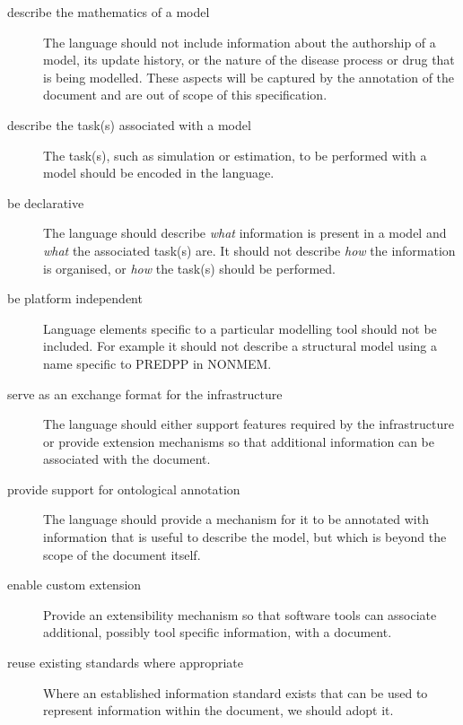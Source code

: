 \begin{description}
\item[describe the mathematics of a model] The language should not include 
information about the authorship of a model, its update history, or the nature 
of the disease process or drug that is being modelled. These aspects will be 
captured by the annotation of the \pharmml document and are out of scope 
of this specification.
\item[describe the task(s) associated with a model] The task(s), such as simulation 
or estimation, to be performed with a model should be encoded in the language.
\item[be declarative] The language should describe \emph{what} information is 
present in a model and \emph{what} the associated task(s) are. It should not 
describe \emph{how} the information is organised, or \emph{how} the task(s) 
should be performed.
\item[be platform independent] Language elements specific to a particular 
modelling tool should not be included. For example it should not describe 
a structural model using a name specific to PREDPP in NONMEM.
\item[serve as an exchange format for the \ddmore infrastructure] The language 
should either support features required by the infrastructure or provide extension 
mechanisms so that additional information can be associated with the \pharmml 
document.
\item[provide support for ontological annotation] The language should provide 
a mechanism for it to be annotated with information that is useful to describe 
the model, but which is beyond the scope of the \pharmml document itself.
\item[enable custom extension] Provide an extensibility mechanism so that 
software tools can associate additional, possibly tool specific information, 
with a \pharmml document.
\item[reuse existing standards where appropriate] Where an established 
information standard exists that can be used to represent information within 
the \pharmml document, we should adopt it.
\end{description}


